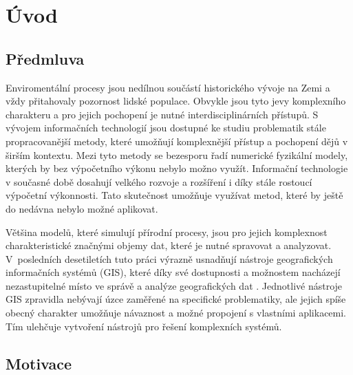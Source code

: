 \documentclass[a4paper,12pt,oneside]{report}
\newcommand{\necislovana}[1]{%
\phantomsection
\addcontentsline{toc}{section}{#1}
\section*{#1}
\markboth{\uppercase{#1}}{}
}
\begin{document}
\newpage

\newpage

\tableofcontents


\newpage
\necislovana{Úvod}

\pagestyle{fancy}
\fancyhf{}
\renewcommand{\sectionmark}[1]{\markboth{#1}{}} %
{}
\fancyhead[R]{\leftmark} %
\fancyfoot[C]{\thepage}


\setcounter{page}{1}
\subsection*{Předmluva}


Enviromentální procesy jsou nedílnou součástí historického vývoje na
Zemi a vždy přitahovaly pozornost lidské populace. Obvykle jsou tyto
jevy komplexního charakteru a pro jejich pochopení je nutné
interdisciplinárních přístupů. S vývojem informačních technologií jsou
dostupné ke studiu problematik stále propracovanější metody, které
umožňují komplexnější přístup a pochopení dějů v širším kontextu. Mezi
tyto metody se bezesporu řadí numerické fyzikální modely, kterých by
bez výpočetního výkonu nebylo možno využít. Informační technologie v
současné době dosahují velkého rozvoje a rozšíření i díky stále
rostoucí výpočetní výkonnosti. Tato skutečnost umožňuje využívat
metod, které by ještě do nedávna nebylo možné aplikovat.

Většina modelů, které simulují přírodní procesy, jsou pro jejich
komplexnost charakteristické značnými objemy dat, které je nutné
spravovat a analyzovat. V~posle\-dních desetiletích tuto práci výrazně
usnadňují nástroje geografických informačních systémů (GIS),
které díky své dostupnosti a možnostem nacházejí nezastupitelné místo
ve správě a analýze geografických dat \cite{coppock}.
Jednotlivé nástroje GIS zpravidla nebývají
úzce zaměřené na specifické problematiky, ale jejich spíše obecný
charakter umožňuje návaznost a možné propojení s vlastními aplikacemi.
Tím ulehčuje vytvoření nástrojů pro řešení komplexních systémů.

\subsection*{Motivace}
\end{document}
